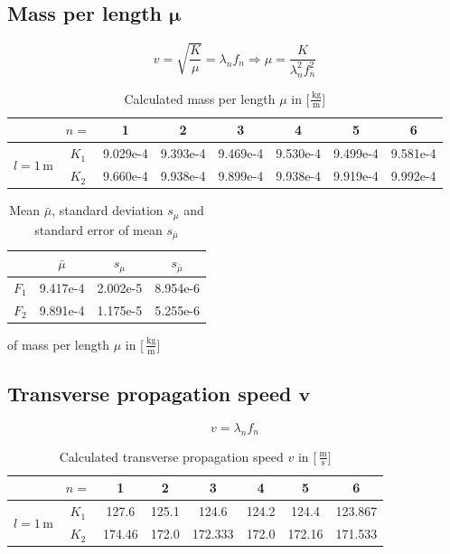 \documentclass{scrreprt}
\newcommand{\unit}[1]{\ensuremath{\, \mathrm{#1}}}
\begin{document}
\subsection[Mass per length]{Mass per length $\bm{\mu}$}

\begin{equation}
v=\sqrt{\frac{K}{\mu}}=\lambda_n f_n \Rightarrow \mu = \frac{K}{\lambda_n^2 f_n^2} 
\end{equation}

\begin{table}[H]
	\center
	\begin{tabular}{|c|c|cccccc|}
	\cline{2-8}
	 \multicolumn{1}{c|}{}& $n=$ & 1 & 2 & 3 & 4 & 5 & 6\\  \hline
	\multirow{2}{*}{$l=1\unit{m}$} & $K_1$ & 9.029e-4 & 9.393e-4 & 9.469e-4 & 9.530e-4 & 9.499e-4 & 9.581e-4\\
	& $K_2$ & 9.660e-4 & 9.938e-4 & 9.899e-4 & 9.938e-4 & 9.919e-4 & 9.992e-4\\
	\hline
	\end{tabular}
	\caption{Calculated mass per length $\mu$ in [$\frac{\unit{kg}}{\unit{m}}$]}
\end{table}

\begin{table}[H]
\center
\begin{tabular}{|c|ccc|}
\cline{2-4}
\multicolumn{1}{c|}{}& $\bar{\mu}$ & $s_{\mu}$ & $s_{\bar{\mu}}$\\ \hline
$F_1$ & 9.417e-4 & 2.002e-5 & 8.954e-6 \\ \hline
$F_2$ & 9.891e-4 & 1.175e-5 & 5.255e-6\\ \hline
\end{tabular}
\caption{Mean $\bar{\mu}$, standard deviation $s_{\mu}$ and standard error of mean $s_{\bar{\mu}}$} of mass per length $\mu$ in [$\unit{\frac{kg}{m}}$]
\end{table}

\subsection[Transervse propagation speed]{Transverse propagation speed $\bm{v}$}

\begin{equation}
v=\lambda_n f_n
\end{equation}

\begin{table}[H]
	\center
	\begin{tabular}{|c|c|cccccc|}
	\cline{2-8}
	 \multicolumn{1}{c|}{}& $n=$ & 1 & 2 & 3 & 4 & 5 & 6\\  \hline
	\multirow{2}{*}{$l=1\unit{m}$} & $K_1$ & 127.6 & 125.1 & 124.6 & 124.2 & 124.4 & 123.867\\
	& $K_2$ & 174.46 & 172.0 & 172.333 & 172.0 & 172.16 & 171.533\\
	\hline
	\end{tabular}
	\caption{Calculated transverse propagation speed $v$ in [$\unit{\frac{m}{s}}]$}
\end{table}
\end{document}
